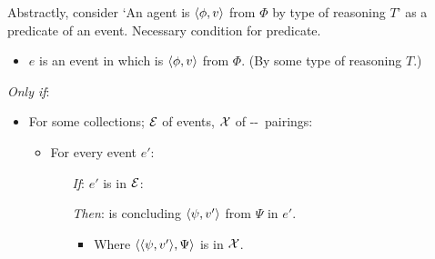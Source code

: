 \begin{note}
  Abstractly, consider `An agent is \emph{\dtCV{}} \(\langle \phi, v \rangle\) from \(\Phi\) by type of reasoning \(T\)' as a predicate of an event.
  Necessary condition for predicate.

  \begin{idea}[\dtCN{2}]
    \label{idea:tR-law}

    \begin{itemize}
    \item
      \(e\) is an event in which \vAgent{} is \emph{\dtCV{}} \(\langle \phi, v \rangle\) from \(\Phi\).\newline
      \hfill(By some type of reasoning \(T\).)
    \end{itemize}

    \emph{Only if}:

    \begin{itemize}
    \item
      For some collections; \({\cal E}\) of events, \({\cal X}\) of --~pairings:
      \begin{itemize}
      \item
        For every event \(e'\):
        \begin{enumerate}
        \item[\emph{If}:]
          \(e'\) is in \({\cal E}\):
        \item[\emph{Then}:]
          \vAgent{} is concluding \(\langle \psi, v' \rangle\) from \(\Psi\) in \(e'\).
          \begin{itemize}
          \item
            Where \(\langle \langle \psi, v' \rangle, \Psi \rangle\) is in \({\cal X}\).
          \end{itemize}
        \end{enumerate}
      \end{itemize}
    \end{itemize}
    \vspace{-\baselineskip}
  \end{idea}


\end{note}
